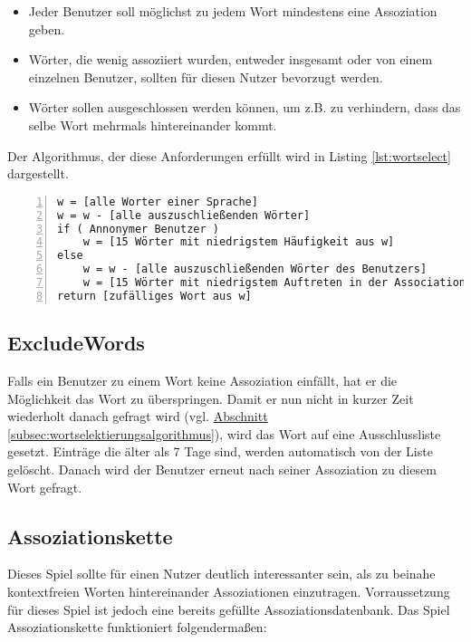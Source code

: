 \begin{itemize}
	\item Jeder Benutzer soll möglichst zu jedem Wort mindestens eine Assoziation geben.
	\item Wörter, die wenig assoziiert wurden, entweder insgesamt oder von einem einzelnen Benutzer, sollten für diesen Nutzer bevorzugt werden.
	\item Wörter sollen ausgeschlossen werden können, um z.B. zu verhindern, dass das selbe Wort mehrmals hintereinander kommt.
\end{itemize}

Der Algorithmus, der diese Anforderungen erfüllt wird in Listing \ref{lst:wortselect} dargestellt.

\begin{lstlisting}[basicstyle=\ttfamily,
backgroundcolor=\color{lightgray},
showspaces=false,
showstringspaces=false,
showtabs=false,
columns=fixed,
frame=lines,
numbers=left,
numbersep=5pt,
breaklines=true,
captionpos=b,
label=lst:wortselect,
caption=Wortselektierungsalgorithmus]
w = [alle Worter einer Sprache]
w = w - [alle auszuschließenden Wörter]
if ( Annonymer Benutzer )
    w = [15 Wörter mit niedrigstem Häufigkeit aus w]
else
    w = w - [alle auszuschließenden Wörter des Benutzers]
    w = [15 Wörter mit niedrigstem Auftreten in der AssociationHistory des Buntzers1 aus w]
return [zufälliges Wort aus w]
\end{lstlisting}

\subsection{ExcludeWords}\label{subsec:excludewords}
Falls ein Benutzer zu einem Wort keine Assoziation einfällt, hat er die
Möglichkeit das Wort zu überspringen. Damit er nun nicht in kurzer Zeit
wiederholt danach gefragt wird (vgl.
\hyperref[subsec:wortselektierungsalgorithmus]
{Abschnitt \ref*{subsec:wortselektierungsalgorithmus}}), wird das Wort auf eine
Ausschlussliste gesetzt. Einträge die älter als 7 Tage sind, werden
automatisch von der Liste gelöscht. Danach wird der Benutzer erneut nach
seiner Assoziation zu diesem Wort gefragt.


\subsection{Assoziationskette}
Dieses Spiel sollte für einen Nutzer deutlich interessanter sein, als zu
beinahe kontextfreien Worten hintereinander Assoziationen einzutragen.
Vorraussetzung für dieses Spiel ist jedoch eine bereits gefüllte
Assoziationsdatenbank. Das Spiel Assoziationskette funktioniert folgendermaßen:

